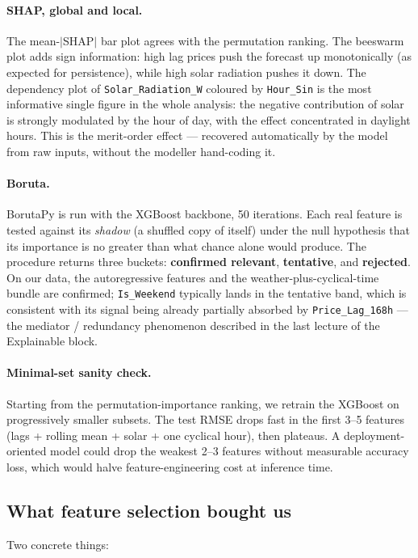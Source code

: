 \documentclass[11pt,a4paper]{article}
\newcommand{\code}[1]{\allowbreak\texttt{\small #1}\allowbreak}
\begin{document}
\paragraph{SHAP, global and local.}
The mean-$|$SHAP$|$ bar plot agrees with the permutation ranking. The
beeswarm plot adds sign information: high lag prices push the forecast
up monotonically (as expected for persistence), while high solar
radiation pushes it down. The dependency plot of
\code{Solar\_Radiation\_W} coloured by \code{Hour\_Sin} is the most
informative single figure in the whole analysis: the negative
contribution of solar is strongly modulated by the hour of day, with
the effect concentrated in daylight hours. This is the merit-order
effect --- recovered automatically by the model from raw inputs,
without the modeller hand-coding it.

\paragraph{Boruta.}
BorutaPy is run with the XGBoost backbone, 50 iterations. Each real
feature is tested against its \emph{shadow} (a shuffled copy of itself)
under the null hypothesis that its importance is no greater than what
chance alone would produce. The procedure returns three buckets:
\textbf{confirmed relevant}, \textbf{tentative}, and \textbf{rejected}.
On our data, the autoregressive features and the
weather-plus-cyclical-time bundle are confirmed; \code{Is\_Weekend}
typically lands in the tentative band, which is consistent with its
signal being already partially absorbed by \code{Price\_Lag\_168h} ---
the mediator / redundancy phenomenon described in the last lecture of the Explainable block.

\paragraph{Minimal-set sanity check.}
Starting from the permutation-importance ranking, we retrain the
XGBoost on progressively smaller subsets. The test RMSE drops fast in
the first 3--5 features (lags + rolling mean + solar + one cyclical
hour), then plateaus. A deployment-oriented model could drop the
weakest 2--3 features without measurable accuracy loss, which would
halve feature-engineering cost at inference time.

\subsection{What feature selection bought us}
Two concrete things:
\end{document}
